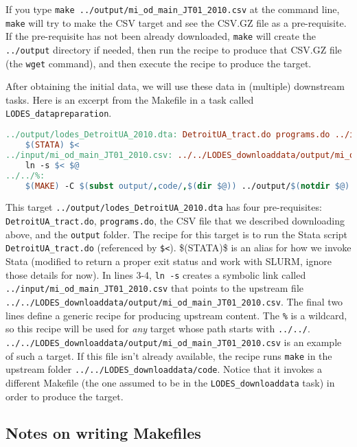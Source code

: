 If you type \texttt{make ../output/mi\_od\_main\_JT01\_2010.csv} at the command line, \texttt{make} will try to make the CSV target and see the CSV.GZ file as a pre-requisite.
If the pre-requisite has not been already downloaded, \texttt{make} will create the \texttt{../output} directory if needed,
then run the recipe to produce that CSV.GZ file (the \texttt{wget} command),
and then execute the recipe to produce the target.

After obtaining the initial data, we will use these data in (multiple) downstream tasks.
Here is an excerpt from the Makefile in a task called \texttt{LODES\_datapreparation}.
\begin{lstlisting}[language=make]
../output/lodes_DetroitUA_2010.dta: DetroitUA_tract.do programs.do ../input/mi_od_main_JT01_2010.csv | ../output
	$(STATA) $<
../input/mi_od_main_JT01_2010.csv: ../../LODES_downloaddata/output/mi_od_main_JT01_2010.csv | ../input
	ln -s $< $@
../../%:
	$(MAKE) -C $(subst output/,code/,$(dir $@)) ../output/$(notdir $@)
\end{lstlisting}
This target \texttt{../output/lodes\_DetroitUA\_2010.dta} has four pre-requisites:
\texttt{DetroitUA\_tract.do}, \texttt{programs.do}, the CSV file that we described downloading above, and the \texttt{output} folder.
The recipe for this target is to run the Stata script \texttt{DetroitUA\_tract.do} (referenced by \texttt{\$<}).
\$(STATA)\$ is an alias for how we invoke Stata
(modified to return a proper exit status and work with SLURM, ignore those details for now).
In lines 3-4, \texttt{ln -s} creates a symbolic link called \texttt{../input/mi\_od\_main\_JT01\_2010.csv} that points to the upstream file
\texttt{../../LODES\_downloaddata/output/mi\_od\_main\_JT01\_2010.csv}.
The final two lines define a generic recipe for producing upstream content.
The \texttt{\%} is a wildcard, so this recipe will be used for \textit{any} target whose path starts with \texttt{../../}.
\texttt{../../LODES\_downloaddata/output/mi\_od\_main\_JT01\_2010.csv} is an example of such a target.
If this file isn't already available,
the recipe runs \texttt{make} in the upstream folder 
\texttt{../../LODES\_downloaddata/code}.
Notice that it invokes a different Makefile (the one assumed to be in the \texttt{LODES\_downloaddata} task)
in order to produce the target.

\subsection{Notes on writing Makefiles}

